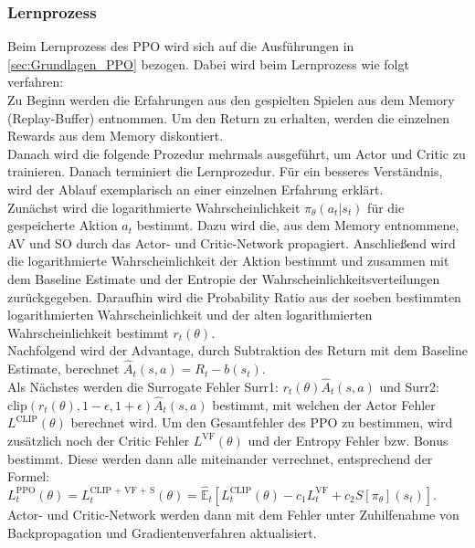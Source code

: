 \subsubsection{Lernprozess} \label{subsubsec:Konzept_Lernprozess_PPO}
Beim Lernprozess des PPO wird sich auf die Ausführungen in \autoref{sec:Grundlagen_PPO} bezogen. Dabei wird beim Lernprozess wie folgt verfahren:\\
Zu Beginn werden die Erfahrungen aus den gespielten Spielen aus dem Memory (Replay-Buffer) entnommen.
Um den Return zu erhalten, werden die einzelnen Rewards aus dem Memory diskontiert.\\
Danach wird die folgende Prozedur mehrmals ausgeführt, um Actor und Critic zu trainieren. Danach terminiert die Lernprozedur.
Für ein besseres Verständnis, wird der Ablauf exemplarisch an einer einzelnen Erfahrung erklärt.\\
Zunächst wird die logarithmierte Wahrscheinlichkeit $\pi_{\theta}(a_{t}|s_{t})$ für die gespeicherte Aktion $a_t$ bestimmt. Dazu wird die, aus dem Memory entnommene, AV und SO durch das Actor- und Critic-Network propagiert. Anschließend wird die logarithmierte Wahrscheinlichkeit der Aktion bestimmt und zusammen mit dem Baseline Estimate und der Entropie der Wahrscheinlichkeitsverteilungen zurückgegeben.
Daraufhin wird die Probability Ratio aus der soeben bestimmten logarithmierten Wahrscheinlichkeit und der alten logarithmierten Wahrscheinlichkeit bestimmt $r_{t}(\theta)$.\\
Nachfolgend wird der Advantage, durch Subtraktion des Return mit dem Baseline Estimate, berechnet $\hat{A}_{t}(s, a) = R_{t} - b(s_{t})$.\\
Als Nächstes werden die Surrogate Fehler Surr1: $r_{t}(\theta) \hat{A}_{t}(s, a)$ und 
Surr2: $\text{clip}(r_{t}(\theta), 1 - \epsilon, 1 + \epsilon) \hat{A}_{t}(s, a)$ bestimmt, mit welchen der Actor Fehler $L^\text{CLIP} (\theta)$ berechnet wird.
Um den Gesamtfehler des PPO zu bestimmen, wird zusätzlich noch der Critic Fehler $L^{\text{VF}} (\theta)$ und der Entropy Fehler bzw. Bonus bestimmt. Diese werden dann alle miteinander verrechnet, entsprechend der Formel:\\
$L^\text{PPO}_{t} (\theta) = L^\text{CLIP + VF + S}_{t} (\theta) = \mathbb{\hat{E}}_{t} [L^{\text{CLIP}}_{t}(\theta) - c_{1}L^{\text{VF}}_{t} + c_{2}S[\pi_{\theta}](s_{t})]$.\\
Actor- und Critic-Network werden dann mit dem Fehler unter Zuhilfenahme von Backpropagation und Gradientenverfahren aktualisiert.

